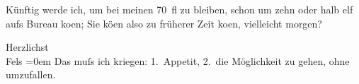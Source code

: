 \pstart
           Künftig werde ich, um bei meinen 70 fl zu bleiben, schon um zehn oder halb elf aufs
               Bureau ko{\geminationm}en; Sie kö{\geminationn}en
               also zu früherer Zeit ko{\geminationm}en, vielleicht morgen?\pend
           
\pstart
           Herzlichst{\\[\baselineskip]}\spacefill\mbox{Fels}\pend
           \leftskip=0em{}
\pstart
           \noindent{}Das muſs ich kriegen: 1. Appetit, 2. die Möglichkeit zu gehen, ohne
                  umzufallen.\pend
           \endnumbering{}  \newcommand{\dateiname}{L00154}\newcommand{\titel}{Friedrich M. Fels an Arthur Schnitzler, [1. 1. 1893?]}\newcommand{\editorInnen}{Martin Anton Müller und Gerd-Hermann Susen}
